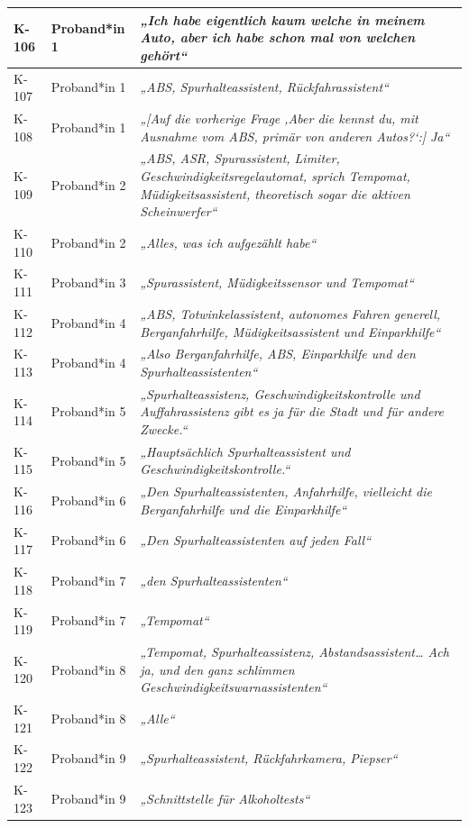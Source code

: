 {\begin{xltabular}{\textwidth}{
    |P{0.10\textwidth}
    |P{0.17\textwidth}
    |Y|
}
K-106 & Proband*in 1 & \textit{„Ich habe eigentlich kaum welche in meinem Auto, aber ich habe schon mal von welchen gehört“} \\
\hline
K-107 & Proband*in 1 & \textit{„ABS, Spurhalteassistent, Rückfahrassistent“} \\
\hline
K-108 & Proband*in 1 & \textit{„[Auf die vorherige Frage ‚Aber die kennst du, mit Ausnahme vom ABS, primär von anderen Autos?‘:] Ja“} \\
\hline
K-109 & Proband*in 2 & \textit{„ABS, ASR, Spurassistent, Limiter, Geschwindigkeitsregelautomat, sprich Tempomat, Müdigkeitsassistent, theoretisch sogar die aktiven Scheinwerfer“} \\
\hline
K-110 & Proband*in 2 & \textit{„Alles, was ich aufgezählt habe“} \\
\hline
K-111 & Proband*in 3 & \textit{„Spurassistent, Müdigkeitssensor und Tempomat“} \\
\hline
K-112 & Proband*in 4 & \textit{„ABS, Totwinkelassistent, autonomes Fahren generell, Berganfahrhilfe, Müdigkeitsassistent und Einparkhilfe“} \\
\hline
K-113 & Proband*in 4 & \textit{„Also Berganfahrhilfe, ABS, Einparkhilfe und den Spurhalteassistenten“} \\
\hline
K-114 & Proband*in 5 & \textit{„Spurhalteassistenz, Geschwindigkeitskontrolle und Auffahrassistenz gibt es ja für die Stadt und für andere Zwecke.“} \\
\hline
K-115 & Proband*in 5 & \textit{„Hauptsächlich Spurhalteassistent und Geschwindigkeitskontrolle.“} \\
\hline
K-116 & Proband*in 6 & \textit{„Den Spurhalteassistenten, Anfahrhilfe, vielleicht die Berganfahrhilfe und die Einparkhilfe“} \\
\hline
K-117 & Proband*in 6 & \textit{„Den Spurhalteassistenten auf jeden Fall“} \\
\hline
K-118 & Proband*in 7 & \textit{„den Spurhalteassistenten“} \\
\hline
K-119 & Proband*in 7 & \textit{„Tempomat“} \\
\hline
K-120 & Proband*in 8 & \textit{„Tempomat, Spurhalteassistenz, Abstandsassistent… Ach ja, und den ganz schlimmen Geschwindigkeitswarnassistenten“} \\
\hline
K-121 & Proband*in 8 & \textit{„Alle“} \\
\hline
K-122 & Proband*in 9 & \textit{„Spurhalteassistent, Rückfahrkamera, Piepser“} \\
\hline
K-123 & Proband*in 9 & \textit{„Schnittstelle für Alkoholtests“} \\

\end{xltabular}}
